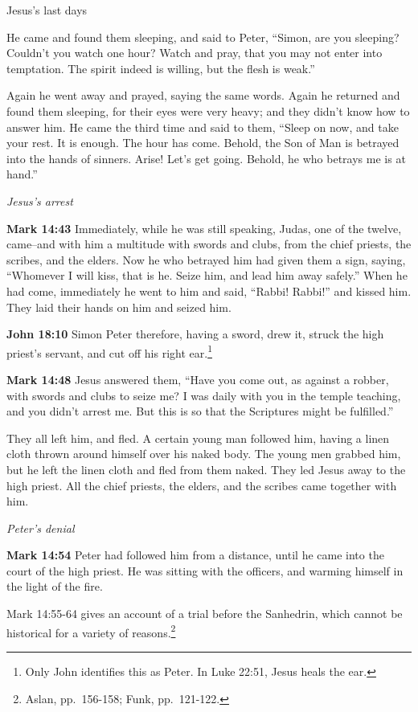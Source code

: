 \documentclass[10pt,twoside]{article} %
\newcommand{\quotesize}{\normalsize{}}
\newcommand{\comm}[1]{\begingroup \color{black!50} #1\endgroup}
\newenvironment{quotetext}{\begingroup\quotesize}{\endgroup}
\newcommand{\bible}[2]{\begin{quotetext}\textbf{#1} #2\end{quotetext}}
\newcommand{\gospelmark}[2]{\bible{Mark #1}{#2}}
\newcommand{\john}[2]{\bible{John #1}{#2}}
\newcommand{\subhead}[1]{\emph{#1}\par}
\begin{document}
\begin{section}{Jesus's last days}
{  He came and found them sleeping, and said to Peter, ``Simon, are you sleeping? Couldn't you watch one hour?    Watch and pray, that you may not enter into temptation. The spirit indeed is willing, but the flesh is weak.''

  Again he went away and prayed, saying the same words.   Again he returned and found them sleeping, for their eyes were very heavy; and they didn't know how to answer him.   He came the third time and said to them, ``Sleep on now, and take your rest. It is enough. The hour has come. Behold, the Son of Man is betrayed into the hands of sinners.    Arise! Let's get going. Behold, he who betrays me is at hand.''
}

\subhead{Jesus's arrest}

\gospelmark{14:43}{
  Immediately, while he was still speaking, Judas, one of the twelve, came--and with him a multitude with swords and clubs, from the chief priests, the scribes, and the elders.   Now he who betrayed him had given them a sign, saying, ``Whomever I will kiss, that is he. Seize him, and lead him away safely.''   When he had come, immediately he went to him and said, ``Rabbi! Rabbi!'' and kissed him.   They laid their hands on him and seized him.}

\john{18:10}{
  Simon Peter therefore, having a sword, drew it, struck the high priest’s servant, and cut off his right ear.\footnote{Only John identifies this as Peter. In Luke 22:51, Jesus heals the ear.}
}

\gospelmark{14:48}{
  Jesus answered them, ``Have you come out, as against a robber, with swords and clubs to seize me?    I was daily with you in the temple teaching, and you didn't arrest me. But this is so that the Scriptures might be fulfilled.''

  They all left him, and fled.   A certain young man followed him, having a linen cloth thrown around himself over his naked body. The young men grabbed him,   but he left the linen cloth and fled from them naked.   They led Jesus away to the high priest. All the chief priests, the elders, and the scribes came together with him.
}

\subhead{Peter's denial}

\gospelmark{14:54}{
  Peter had followed him from a distance, until he came into the court of the high priest. He was sitting with the officers, and warming himself in the light of the fire.}

\comm{Mark 14:55-64 gives an account of a trial before the Sanhedrin, which cannot be historical for a variety of reasons.\footnote{Aslan, pp.~156-158;
Funk, pp.~121-122.}}


\end{section}
\end{document}
